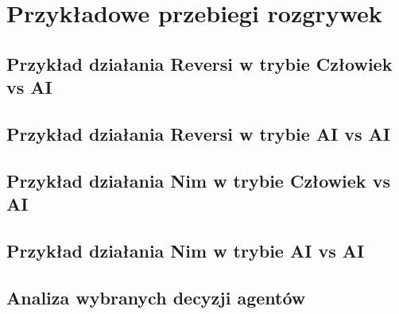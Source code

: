 \chapter{Przykładowe przebiegi rozgrywek}

\section{Przykład działania Reversi w trybie Człowiek vs AI}

\section{Przykład działania Reversi w trybie AI vs AI}

\section{Przykład działania Nim w trybie Człowiek vs AI}

\section{Przykład działania Nim w trybie AI vs AI}

\section{Analiza wybranych decyzji agentów}
